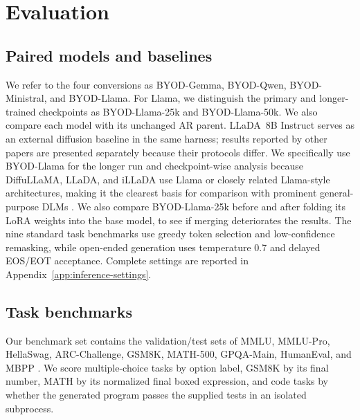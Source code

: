 \documentclass{article}
\begin{document}
\section{Evaluation}
\subsection{Paired models and baselines}
We refer to the four conversions as BYOD-Gemma, BYOD-Qwen, BYOD-Ministral, and BYOD-Llama. For Llama, we distinguish the primary and longer-trained checkpoints as BYOD-Llama-25k and BYOD-Llama-50k. We also compare each model with its unchanged AR parent. LLaDA~8B Instruct serves as an external diffusion baseline in the same harness; results reported by other papers are presented separately because their protocols differ. We specifically use BYOD-Llama for the longer run and checkpoint-wise analysis because DiffuLLaMA, LLaDA, and iLLaDA use Llama or closely related Llama-style architectures, making it the clearest basis for comparison with prominent general-purpose DLMs \citep{gong2025diffullama,nie2025llada,nie2026illada}. We also compare BYOD-Llama-25k before and after folding its LoRA weights into the base model, to see if merging deteriorates the results. The nine standard task benchmarks use greedy token selection and low-confidence remasking, while open-ended generation uses temperature 0.7 and delayed EOS/EOT acceptance. Complete settings are reported in Appendix~\ref{app:inference-settings}.

\subsection{Task benchmarks}
Our benchmark set contains the validation/test sets of MMLU, MMLU-Pro, HellaSwag, ARC-Challenge, GSM8K, MATH-500, GPQA-Main, HumanEval, and MBPP \citep{hendrycks2021mmlu,wang2024mmlupro,zellers2019hellaswag,clark2018arc,cobbe2021gsm8k,hendrycks2021math,rein2023gpqa,chen2021codex,austin2021mbpp}. We score multiple-choice tasks by option label, GSM8K by its final number, MATH by its normalized final boxed expression, and code tasks by whether the generated program passes the supplied tests in an isolated subprocess.
\end{document}
